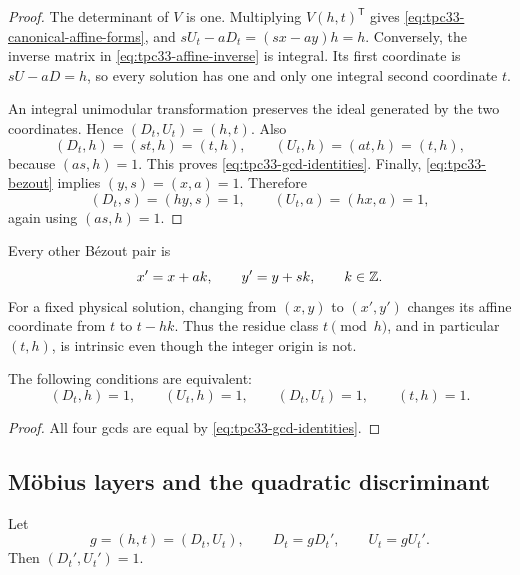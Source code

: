 \begin{proof}
The determinant of \(V\) is one.  Multiplying
\(V(h,t)^{\mathsf T}\) gives \eqref{eq:tpc33-canonical-affine-forms},
and \(sU_t-aD_t=(sx-ay)h=h\).  Conversely, the inverse matrix in
\eqref{eq:tpc33-affine-inverse} is integral.  Its first coordinate is
\(sU-aD=h\), so every solution has one and only one integral second
coordinate \(t\).

An integral unimodular transformation preserves the ideal generated by the
two coordinates.  Hence
\((D_t,U_t)=(h,t)\).  Also
\[
 (D_t,h)=(st,h)=(t,h),
 \qquad
 (U_t,h)=(at,h)=(t,h),
\]
because \((as,h)=1\).  This proves \eqref{eq:tpc33-gcd-identities}.
Finally, \eqref{eq:tpc33-bezout} implies \((y,s)=(x,a)=1\).  Therefore
\[
 (D_t,s)=(hy,s)=1,
 \qquad
 (U_t,a)=(hx,a)=1,
\]
again using \((as,h)=1\).
\end{proof}

Every other B\'ezout pair is
\begin{equation}
 x'=x+ak,\qquad y'=y+sk,\qquad k\in\mathbb Z.
 \label{eq:tpc33-bezout-change}
\end{equation}
For a fixed physical solution, changing from \((x,y)\) to \((x',y')\)
changes its affine coordinate from \(t\) to \(t-hk\).  Thus the residue
class \(t\pmod h\), and in particular \((t,h)\), is intrinsic even though
the integer origin is not.

\begin{corollary}
\label{cor:tpc33-primitive-layer}
The following conditions are equivalent:
\begin{equation}
 (D_t,h)=1,\qquad
 (U_t,h)=1,\qquad
 (D_t,U_t)=1,\qquad
 (t,h)=1.
 \label{eq:tpc33-primitive-equivalences}
\end{equation}
\end{corollary}

\begin{proof}
All four gcds are equal by \eqref{eq:tpc33-gcd-identities}.
\end{proof}

\subsection{M\"obius layers and the quadratic discriminant}

Let
\begin{equation}
 g=(h,t)=(D_t,U_t),\qquad
 D_t=gD_t',\qquad U_t=gU_t'.
 \label{eq:tpc33-common-gcd-layer}
\end{equation}
Then \((D_t',U_t')=1\).

